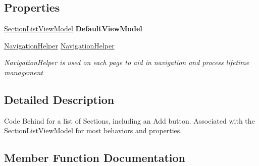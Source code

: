 \subsection*{Properties}
\begin{DoxyCompactItemize}
\item 
\hyperlink{class_listen_to_me_1_1_view_model_1_1_section_list_view_model}{Section\+List\+View\+Model} {\bfseries Default\+View\+Model}\hypertarget{class_listen_to_me_1_1_view_1_1_section_list_view_a0610595226ba809e099c7b2e43b62d72}{}\label{class_listen_to_me_1_1_view_1_1_section_list_view_a0610595226ba809e099c7b2e43b62d72}

\item 
\hyperlink{class_listen_to_me_1_1_common_1_1_navigation_helper}{Navigation\+Helper} \hyperlink{class_listen_to_me_1_1_view_1_1_section_list_view_a5f9c6830b94bcfc37771ec1b64b959f8}{Navigation\+Helper}
\begin{DoxyCompactList}\small\item\em Navigation\+Helper is used on each page to aid in navigation and process lifetime management \end{DoxyCompactList}\end{DoxyCompactItemize}


\subsection{Detailed Description}
Code Behind for a list of Sections, including an Add button. Associated with the Section\+List\+View\+Model for most behaviors and properties. 



\subsection{Member Function Documentation}
